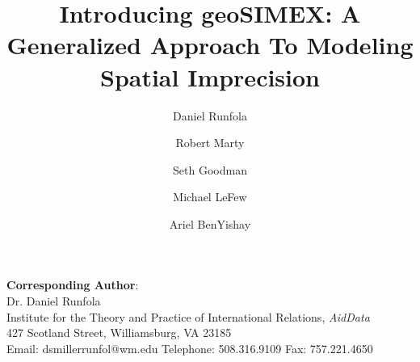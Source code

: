 


\author[1]{Daniel Runfola}
\author[1]{Robert Marty}
\author[1]{Seth Goodman}
\author[1]{Michael LeFew}
\author[2]{Ariel BenYishay}
\renewcommand\Authands{ and }

\title{Introducing geoSIMEX: A Generalized Approach To Modeling Spatial Imprecision}



\usepackage{Sweave}




\maketitle 
\begin{flushleft}
\textbf{Corresponding Author}:\\
Dr. Daniel Runfola\\
Institute for the Theory and Practice of International Relations, \emph{AidData}\\
427 Scotland Street, Williamsburg, VA 23185\\
Email: dsmillerrunfol@wm.edu
Telephone: 508.316.9109
Fax: 757.221.4650
\end{flushleft}

\newpage

\doublespacing

